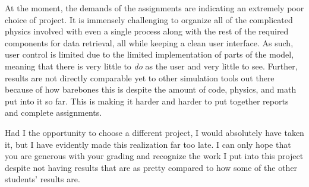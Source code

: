 At the moment, the demands of the assignments are indicating an extremely poor choice of project. It is immensely challenging to organize all of the complicated physics involved with even a single process along with the rest of the required components for data retrieval, all while keeping a clean user interface. As such, user control is limited due to the limited implementation of parts of the model, meaning that there is very little to \textit{do} as the user and very little to see. Further, results are not directly comparable yet to other simulation tools out there because of how barebones this is despite the amount of code, physics, and math put into it so far. This is making it harder and harder to put together reports and complete assignments.

Had I the opportunity to choose a different project, I would absolutely have taken it, but I have evidently made this realization far too late. I can only hope that you are generous with your grading and recognize the work I put into this project despite not having results that are as pretty compared to how some of the other students' results are.



